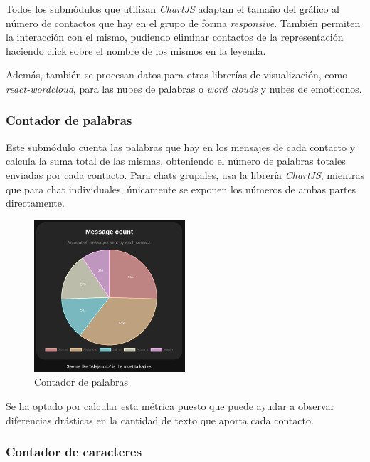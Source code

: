 Todos los submódulos que utilizan \textit{ChartJS} adaptan el tamaño del gráfico al número de contactos que hay en el grupo de forma \textit{responsive}. También permiten la interacción con el mismo, pudiendo eliminar contactos de la representación haciendo click sobre el nombre de los mismos en la leyenda.

Además, también se procesan datos para otras librerías de visualización, como \textit{react-wordcloud}, para las nubes de palabras o \textit{word clouds} y nubes de emoticonos.

\subsubsection{Contador de palabras}

Este submódulo cuenta las palabras que hay en los mensajes de cada contacto y calcula la suma total de las mismas, obteniendo el número de palabras totales enviadas por cada contacto. Para chats grupales, usa la librería \textit{ChartJS}, mientras que para chat individuales, únicamente se exponen los números de ambas partes directamente.

\begin{figure}[H]
	\centering
	\includegraphics[width=0.5\textwidth]{img/word_count.png}
	\caption{Contador de palabras}
	\label{fig:chap4:word_count}
\end{figure}


Se ha optado por calcular esta métrica puesto que puede ayudar a observar diferencias drásticas en la cantidad de texto que aporta cada contacto.

\subsubsection{Contador de caracteres}

